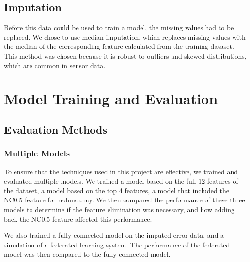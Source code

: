 \documentclass[conference]{IEEEtran}
\begin{document}
\subsection{Imputation}
Before this data could be used to train a model, the missing
values had to be replaced. We chose to use median
imputation, which replaces missing values with the median of
the corresponding feature calculated from the training
dataset. This method was chosen because it is robust to
outliers and skewed distributions, which are common in
sensor data.



\section{Model Training and Evaluation}

\subsection{Evaluation Methods}
\subsubsection{Multiple Models}
To ensure that the techniques used in this project are
effective, we trained and evaluated multiple models. We
trained a model based on the full 12-features of the
dataset, a model based on the top 4 features, a model that
included the NC0.5 feature for redundancy. We then compared
the performance of these three models to determine if the
feature elimination was necessary, and how adding back the
NC0.5 feature affected this performance.

We also trained a fully connected model on the imputed error
data, and a simulation of a federated learning system. The
performance of the federated model was then compared to the
fully connected model.
\end{document}
